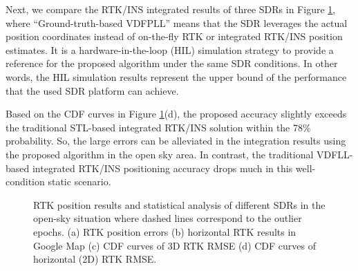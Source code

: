 \documentclass{article}
\newcommand{\reffig}[1]{Figure \ref{#1}}
\begin{document}
Next, we compare the RTK/INS integrated results of three SDRs in \reffig{fig:fig9}, where ``Ground-truth-based VDFPLL'' means that the SDR leverages the actual position coordinates instead of on-the-fly RTK or integrated RTK/INS position estimates. It is a hardware-in-the-loop (HIL) simulation strategy to provide a reference for the proposed algorithm under the same SDR conditions. In other words, the HIL simulation results represent the upper bound of the performance that the used SDR platform can achieve. 

Based on the CDF curves in \reffig{fig:fig9}(d), the proposed accuracy slightly exceeds the traditional STL-based integrated RTK/INS solution within the 78\% probability. So, the large errors can be alleviated in the integration results using the proposed algorithm in the open sky area. In contrast, the traditional VDFLL-based integrated RTK/INS positioning accuracy drops much in this well-condition static scenario.
 
\begin{figure}[htbp]%
\centering
{}%
\hfil
{}%
\hfil
{}%
\hfil
{}%
\caption{RTK position results and statistical analysis of different SDRs in the open-sky situation where dashed lines correspond to the outlier epochs. (a) RTK position errors (b) horizontal RTK results in Google Map (c) CDF curves of 3D RTK RMSE (d) CDF curves of horizontal (2D) RTK RMSE. }%
\label{fig:fig9}%
\end{figure}
\end{document}
